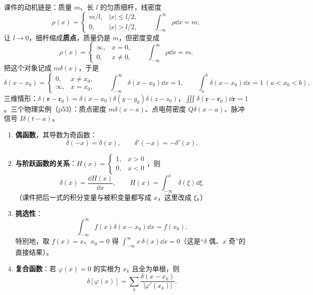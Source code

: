 \documentclass[11pt]{ctexart}
\begin{document}
课件的动机链是：质量 $m$、长 $l$ 的匀质细杆，线密度
\[
\rho(x)=\begin{cases}m/l, & |x|\le l/2,\\ 0, & |x|>l/2,\end{cases}
\qquad \int_{-\infty}^{\infty}\rho\dd x=m ;
\]
让 $l\to0$，细杆缩成\textbf{质点}，质量仍是 $m$，但密度变成
\[
\rho(x)=\begin{cases}\infty, & x=0,\\ 0, & x\ne0,\end{cases}
\qquad \int_{-\infty}^{\infty}\rho\dd x=m .
\]
把这个对象记成 $m\delta(x)$，于是
\[
\delta(x-x_0)=\begin{cases}0, & x\ne x_0,\\ \infty, & x=x_0,\end{cases}
\qquad \int_{-\infty}^{\infty}\delta(x-x_0)\dd x=1,\qquad \int_a^b\delta(x-x_0)\dd x=1\ (a<x_0<b) .
\]
三维情形：$\delta(\mathbf{r}-\mathbf{r}_0)=\delta(x-x_0)\delta(y-y_0)\delta(z-z_0)$，$\iiint\delta(\mathbf{r}-\mathbf{r}_0)\dd\mathbf{r}=1$。三个物理实例（p53）：质点密度 $m\delta(x-a)$、点电荷密度 $Q\delta(x-a)$、脉冲信号 $I\delta(t-a)$。



\begin{enumerate}
\item \textbf{偶函数}，其导数为奇函数：
\[ \delta(-x)=\delta(x),\qquad \delta'(-x)=-\delta'(x) .\]
\item \textbf{与阶跃函数的关系}：$H(x)=\begin{cases}1,&x>0\\0,&x<0\end{cases}$，则
\[ \delta(x)=\frac{\dd H(x)}{\dd x},\qquad H(x)=\int_{-\infty}^{x}\delta(\xi)\dd\xi .\]
（课件把后一式的积分变量与被积变量都写成 $x$，这里改成 $\xi$。）
\item \textbf{挑选性}：
\[ \int_{-\infty}^{\infty}f(x)\delta(x-x_0)\dd x=f(x_0) .\]
特别地，取 $f(x)=x$、$x_0=0$ 得 $\displaystyle\int_{-\infty}^{\infty}x\,\delta(x)\dd x=0$（这是“$\delta$ 偶、$x$ 奇”的直接结果）。
\item \textbf{复合函数}：若 $\varphi(x)=0$ 的实根为 $x_k$ 且全为单根，则
\[ \delta[\varphi(x)]=\sum_{k}\frac{\delta(x-x_k)}{|\varphi'(x_k)|} .\]
\end{enumerate}
\end{document}
